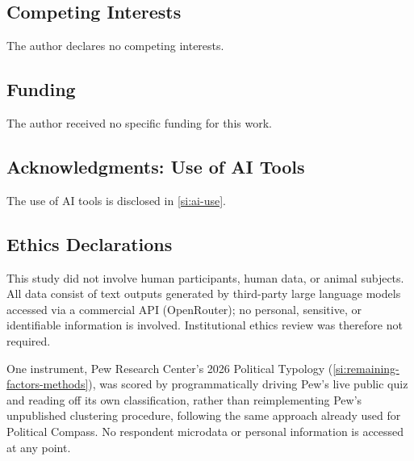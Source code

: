 \documentclass[12pt]{article}
\begin{document}
\subsection*{Competing Interests}
The author declares no competing interests.

\subsection*{Funding}
The author received no specific funding for this work.

\subsection*{Acknowledgments: Use of AI Tools}
The use of AI tools is disclosed in \ref{si:ai-use}.

\subsection*{Ethics Declarations}
This study did not involve human participants, human data, or animal
subjects. All data consist of text outputs generated by third-party large
language models accessed via a commercial API (OpenRouter); no personal,
sensitive, or identifiable information is involved. Institutional ethics
review was therefore not required.

One instrument, Pew Research Center's 2026 Political Typology (\ref{si:remaining-factors-methods}),
was scored by programmatically driving Pew's live public quiz and reading
off its own classification, rather than reimplementing Pew's unpublished
clustering procedure, following the same approach already used for Political Compass. No respondent microdata or personal information is accessed at any point.


\clearpage
\end{document}

